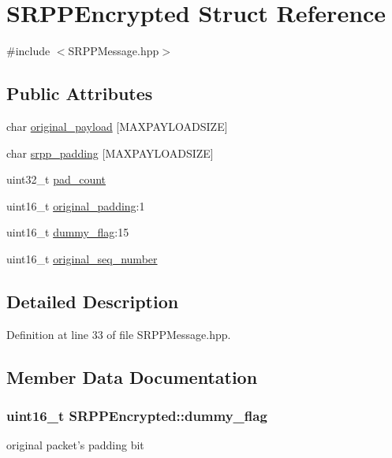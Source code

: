 \hypertarget{struct_s_r_p_p_encrypted}{
\section{SRPPEncrypted Struct Reference}
\label{struct_s_r_p_p_encrypted}
}


{\ttfamily \#include $<$SRPPMessage.hpp$>$}

\subsection*{Public Attributes}
\begin{DoxyCompactItemize}
\item 
char \hyperlink{struct_s_r_p_p_encrypted_a33ecea6c4097b5cfce9b5b9dea56d8c6}{original\_\-payload} \mbox{[}MAXPAYLOADSIZE\mbox{]}
\item 
char \hyperlink{struct_s_r_p_p_encrypted_ad4b65478c1d0521bba8788166acc6340}{srpp\_\-padding} \mbox{[}MAXPAYLOADSIZE\mbox{]}
\item 
uint32\_\-t \hyperlink{struct_s_r_p_p_encrypted_acbe8fec63c0347dc4021e38a9e2dbcc5}{pad\_\-count}
\item 
uint16\_\-t \hyperlink{struct_s_r_p_p_encrypted_abed0d941f10c16d5ad1d6e78db68ccbc}{original\_\-padding}:1
\item 
uint16\_\-t \hyperlink{struct_s_r_p_p_encrypted_a5925a07c2fdc31c4d0c68de304169a43}{dummy\_\-flag}:15
\item 
uint16\_\-t \hyperlink{struct_s_r_p_p_encrypted_a9b74b2f6e42139739ab9248296702a14}{original\_\-seq\_\-number}
\end{DoxyCompactItemize}


\subsection{Detailed Description}


Definition at line 33 of file SRPPMessage.hpp.



\subsection{Member Data Documentation}
\hypertarget{struct_s_r_p_p_encrypted_a5925a07c2fdc31c4d0c68de304169a43}{
\subsubsection[{dummy\_\-flag}]{\setlength{\rightskip}{0pt plus 5cm}uint16\_\-t {\bf SRPPEncrypted::dummy\_\-flag}}}
\label{struct_s_r_p_p_encrypted_a5925a07c2fdc31c4d0c68de304169a43}
original packet's padding bit 

